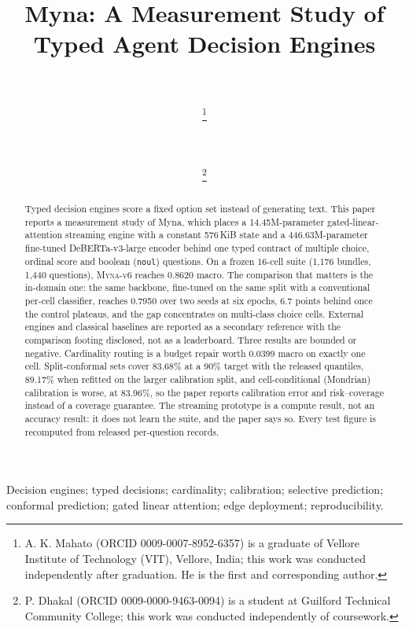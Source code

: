 \documentclass[journal]{IEEEtran}
\newcommand{\vsix}{\textsc{Myna-v6}}
\begin{document}
\title{Myna: A Measurement Study of Typed Agent Decision Engines}
\author{\\
\\
\thanks{A. K. Mahato (ORCID 0009-0007-8952-6357) is a graduate of Vellore Institute of Technology (VIT), Vellore, India; this work was conducted independently after graduation. He is the first and corresponding author.}
\and
{}\\
\\
\thanks{P. Dhakal (ORCID 0009-0000-9463-0094) is a student at Guilford Technical Community College; this work was conducted independently of coursework.}}
\maketitle
\begin{abstract}
Typed decision engines score a fixed option set instead of generating text. This paper reports a
measurement study of Myna, which places a 14.45M-parameter gated-linear-attention streaming engine
with a constant 576\,KiB state and a 446.63M-parameter fine-tuned DeBERTa-v3-large encoder behind one
typed contract of multiple choice, ordinal score and boolean (\texttt{noul}) questions. On a frozen
16-cell suite (1,176 bundles, 1,440 questions), \vsix{} reaches 0.8620 macro. The comparison that
matters is the in-domain one: the same backbone, fine-tuned on the same split with a conventional
per-cell classifier, reaches 0.7950 over two seeds at six epochs, 6.7 points behind once the control plateaus, and the gap concentrates on
multi-class choice cells. External engines and classical baselines are reported as a
secondary reference with the comparison footing disclosed, not as a leaderboard. Three results are bounded or negative.
Cardinality routing is a budget repair worth 0.0399 macro on exactly one cell. Split-conformal sets
cover 83.68\% at a 90\% target with the released quantiles, 89.17\% when refitted on the larger
calibration split, and cell-conditional (Mondrian) calibration is worse, at 83.96\%, so the paper
reports calibration error and risk--coverage instead of a coverage guarantee. The streaming
prototype is a compute result, not an accuracy result: it does not learn the suite, and the paper
says so. Every test figure is recomputed from released per-question records.
\end{abstract}
\begin{IEEEkeywords}
Decision engines; typed decisions; cardinality; calibration; selective prediction; conformal prediction; gated linear attention; edge deployment; reproducibility.
\end{IEEEkeywords}



\clearpage

\end{document}
